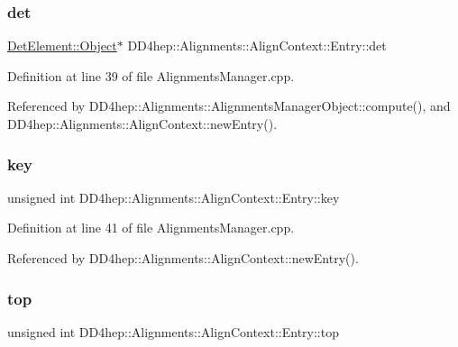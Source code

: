 \subsubsection{\texorpdfstring{det}{det}}
{\footnotesize\ttfamily \hyperlink{class_d_d4hep_1_1_geometry_1_1_det_element_a4e44e860d6e5827d9f42a4aea3a4f288}{Det\+Element\+::\+Object}$\ast$ D\+D4hep\+::\+Alignments\+::\+Align\+Context\+::\+Entry\+::det}



Definition at line 39 of file Alignments\+Manager.\+cpp.



Referenced by D\+D4hep\+::\+Alignments\+::\+Alignments\+Manager\+Object\+::compute(), and D\+D4hep\+::\+Alignments\+::\+Align\+Context\+::new\+Entry().

\hypertarget{struct_d_d4hep_1_1_alignments_1_1_align_context_1_1_entry_a11ecca8923ec80803028766427ce25eb}{}\label{struct_d_d4hep_1_1_alignments_1_1_align_context_1_1_entry_a11ecca8923ec80803028766427ce25eb} 
\subsubsection{\texorpdfstring{key}{key}}
{\footnotesize\ttfamily unsigned int D\+D4hep\+::\+Alignments\+::\+Align\+Context\+::\+Entry\+::key}



Definition at line 41 of file Alignments\+Manager.\+cpp.



Referenced by D\+D4hep\+::\+Alignments\+::\+Align\+Context\+::new\+Entry().

\hypertarget{struct_d_d4hep_1_1_alignments_1_1_align_context_1_1_entry_aa5d088f1704ee169e740e841721f2b2e}{}\label{struct_d_d4hep_1_1_alignments_1_1_align_context_1_1_entry_aa5d088f1704ee169e740e841721f2b2e} 
\subsubsection{\texorpdfstring{top}{top}}
{\footnotesize\ttfamily unsigned int D\+D4hep\+::\+Alignments\+::\+Align\+Context\+::\+Entry\+::top}



